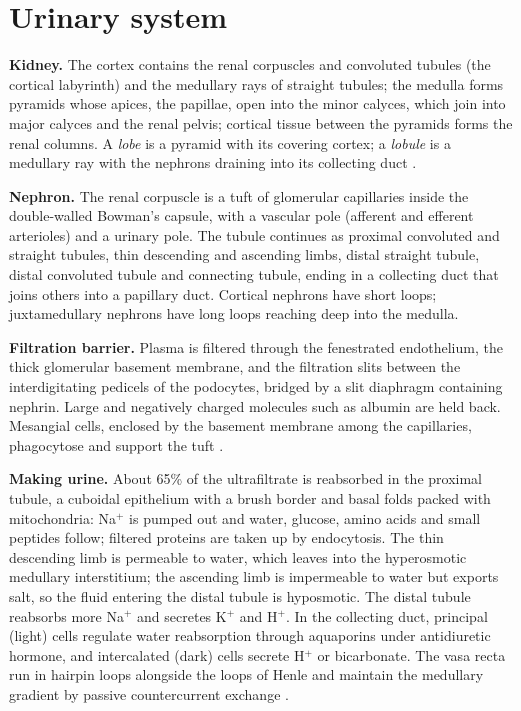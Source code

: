 \section{Urinary system}
\label{section-urinary}

\textbf{Kidney.} The cortex contains the
renal corpuscles and convoluted tubules (the
cortical labyrinth) and the medullary rays of
straight tubules; the medulla forms pyramids
whose apices, the papillae, open into the
minor calyces, which join into major calyces
and the renal pelvis; cortical tissue between
the pyramids forms the renal columns. A
\emph{lobe} is a pyramid with its covering
cortex; a \emph{lobule} is a medullary ray
with the nephrons draining into its
collecting duct \cite[Chapter
20]{ross2011histology}.

\textbf{Nephron.} The renal corpuscle is a
tuft of glomerular capillaries inside the
double-walled Bowman's capsule, with a
vascular pole (afferent and efferent
arterioles) and a urinary pole. The tubule
continues as proximal convoluted and straight
tubules, thin descending and ascending limbs,
distal straight tubule, distal convoluted
tubule and connecting tubule, ending in a
collecting duct that joins others into a
papillary duct. Cortical nephrons have short
loops; juxtamedullary nephrons have long
loops reaching deep into the medulla.

\textbf{Filtration barrier.} Plasma is
filtered through the fenestrated endothelium,
the thick glomerular basement membrane, and
the filtration slits between the
interdigitating pedicels of the podocytes,
bridged by a slit diaphragm containing
nephrin. Large and negatively charged
molecules such as albumin are held back.
Mesangial cells, enclosed by the basement
membrane among the capillaries, phagocytose
and support the tuft \cite[Chapter
20]{ross2011histology}.

\textbf{Making urine.} About 65\% of the
ultrafiltrate is reabsorbed in the proximal
tubule, a cuboidal epithelium with a brush
border and basal folds packed with
mitochondria: Na$^+$ is pumped out and water,
glucose, amino acids and small peptides
follow; filtered proteins are taken up by
endocytosis. The thin descending limb is
permeable to water, which leaves into the
hyperosmotic medullary interstitium; the
ascending limb is impermeable to water but
exports salt, so the fluid entering the
distal tubule is hyposmotic. The distal
tubule reabsorbs more Na$^+$ and secretes
K$^+$ and H$^+$. In the collecting duct,
principal (light) cells regulate water
reabsorption through aquaporins under
antidiuretic hormone, and intercalated (dark)
cells secrete H$^+$ or bicarbonate. The vasa
recta run in hairpin loops alongside the
loops of Henle and maintain the medullary
gradient by passive countercurrent exchange
\cite[Chapter 20]{ross2011histology}.

